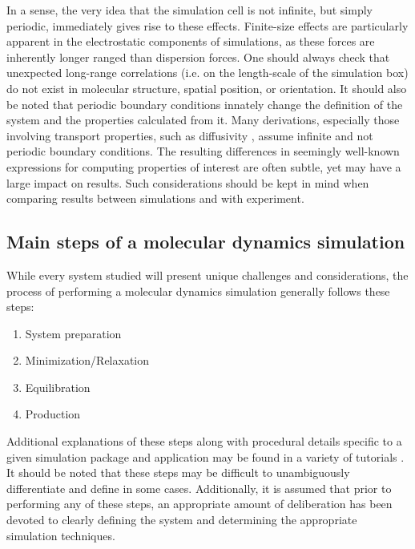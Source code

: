 \documentclass[9pt,bestpractices]{livecoms}
\begin{document}
In a sense, the very idea that the simulation cell is not infinite, but simply periodic, immediately gives rise to these effects. 
Finite-size effects are particularly apparent in the electrostatic components of simulations, as these forces are inherently longer ranged than dispersion forces. 
One should always check that unexpected long-range correlations (i.e. on the length-scale of the simulation box) do not exist in molecular structure, spatial position, or orientation. 
It should also be noted that periodic boundary conditions innately change the definition of the system and the properties calculated from it. 
Many derivations, especially those involving transport properties, such as diffusivity \citep{Yeh2004}, assume infinite and not periodic boundary conditions. %
The resulting differences in seemingly well-known expressions for computing properties of interest are often subtle, yet may have a large impact on results. 
Such considerations should be kept in mind when comparing results between simulations and with experiment.

\subsection{Main steps of a molecular dynamics simulation}
While every system studied will present unique challenges and considerations, the process of performing a molecular dynamics simulation generally follows these steps:

\begin{enumerate}
\item System preparation
\item Minimization/Relaxation
\item Equilibration
\item Production
\end{enumerate}

Additional explanations of these steps along with procedural details specific to a given simulation package and application may be found in a variety of tutorials \citep{LemkulTutorials} \citep{AmberBeginner}. 
It should be noted that these steps may be difficult to unambiguously differentiate and define in some cases. 
Additionally, it is assumed that prior to performing any of these steps, an appropriate amount of deliberation has been devoted to clearly defining the system and determining the appropriate simulation techniques. 
\end{document}
